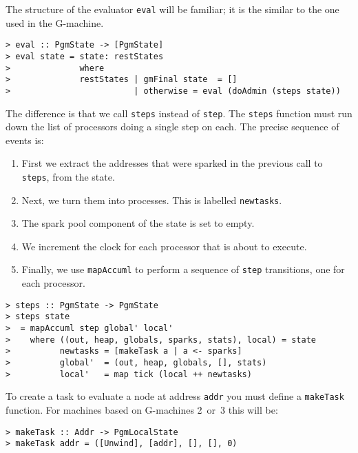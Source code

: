 The structure of the evaluator \mbox{\tt eval} will be familiar; it is the
similar to the one used in the G-machine.
\begin{verbatim}
> eval :: PgmState -> [PgmState]
> eval state = state: restStates
>              where
>              restStates | gmFinal state  = []
>                         | otherwise = eval (doAdmin (steps state))
\end{verbatim}
%
%
The difference is that we call \mbox{\tt steps} instead of \mbox{\tt step}.  The \mbox{\tt steps}
function must run down the list of processors doing a single step on
each. The precise sequence of events is:
\begin{enumerate}

\item First we extract the addresses that were sparked in the previous
call to \mbox{\tt steps}, from the state.

\item Next, we turn them into processes. This is labelled \mbox{\tt newtasks}.

\item The spark pool component of the state is set to empty.

\item We increment the clock for each processor that is about to
execute.

\item Finally, we use \mbox{\tt mapAccuml} to perform a sequence of \mbox{\tt step}
transitions, one for each processor.

\end{enumerate}
\begin{verbatim}
> steps :: PgmState -> PgmState
> steps state
>  = mapAccuml step global' local'
>    where ((out, heap, globals, sparks, stats), local) = state
>          newtasks = [makeTask a | a <- sparks]
>          global'  = (out, heap, globals, [], stats)
>          local'   = map tick (local ++ newtasks)
\end{verbatim}
%
%
\par
To create a task to evaluate a node at address \mbox{\tt addr} you must define
a \mbox{\tt makeTask} function. For machines based on G-machines 2~or~3 this
will be:
\begin{verbatim}
> makeTask :: Addr -> PgmLocalState
> makeTask addr = ([Unwind], [addr], [], [], 0)
\end{verbatim}
